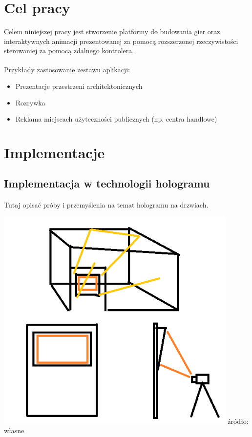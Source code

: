 \documentclass[12pt]{article}
\begin{document}
{{\section{Cel pracy}
\paragraph{}
Celem niniejszej pracy jest stworzenie platformy do budowania gier oraz interaktywnych animacji prezentowanej za pomocą rozszerzonej rzeczywistości sterowaniej za pomocą zdalnego kontrolera.

\paragraph{}
Przykłady zastosowanie zestawu aplikacji:

\begin{itemize}
\item Prezentacje przestrzeni architektonicznych
\item Rozrywka
\item Reklama miejscach użyteczności publicznych (np. centra handlowe)
\end{itemize}


\section{Implementacje}
\subsection{Implementacja w technologii hologramu}
\paragraph{}
{\color{red}Tutaj opisać próby i przemyślenia na temat hologramu na drzwiach.}
\begin{center}
\includegraphics[width=0.9\textwidth]{images/hologramv1.png}
\small {źródło: własne }
\end{center}

}}
\end{document}
